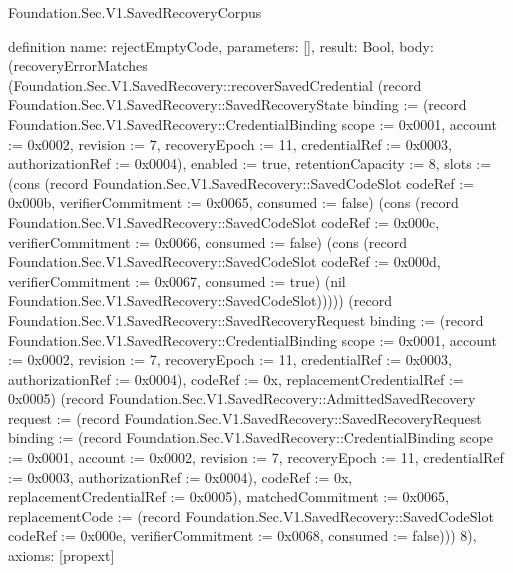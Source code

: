 \begin{lexlean}{Foundation.Sec.V1.SavedRecoveryCorpus}
\begin{semanticmodule}
definition{
  name: rejectEmptyCode,
  parameters: [],
  result: Bool,
  body: (recoveryErrorMatches (Foundation.Sec.V1.SavedRecovery::recoverSavedCredential (record Foundation.Sec.V1.SavedRecovery::SavedRecoveryState {binding := (record Foundation.Sec.V1.SavedRecovery::CredentialBinding {scope := 0x0001, account := 0x0002, revision := 7, recoveryEpoch := 11, credentialRef := 0x0003, authorizationRef := 0x0004}), enabled := true, retentionCapacity := 8, slots := (cons (record Foundation.Sec.V1.SavedRecovery::SavedCodeSlot {codeRef := 0x000b, verifierCommitment := 0x0065, consumed := false}) (cons (record Foundation.Sec.V1.SavedRecovery::SavedCodeSlot {codeRef := 0x000c, verifierCommitment := 0x0066, consumed := false}) (cons (record Foundation.Sec.V1.SavedRecovery::SavedCodeSlot {codeRef := 0x000d, verifierCommitment := 0x0067, consumed := true}) (nil Foundation.Sec.V1.SavedRecovery::SavedCodeSlot))))}) (record Foundation.Sec.V1.SavedRecovery::SavedRecoveryRequest {binding := (record Foundation.Sec.V1.SavedRecovery::CredentialBinding {scope := 0x0001, account := 0x0002, revision := 7, recoveryEpoch := 11, credentialRef := 0x0003, authorizationRef := 0x0004}), codeRef := 0x, replacementCredentialRef := 0x0005}) (record Foundation.Sec.V1.SavedRecovery::AdmittedSavedRecovery {request := (record Foundation.Sec.V1.SavedRecovery::SavedRecoveryRequest {binding := (record Foundation.Sec.V1.SavedRecovery::CredentialBinding {scope := 0x0001, account := 0x0002, revision := 7, recoveryEpoch := 11, credentialRef := 0x0003, authorizationRef := 0x0004}), codeRef := 0x, replacementCredentialRef := 0x0005}), matchedCommitment := 0x0065, replacementCode := (record Foundation.Sec.V1.SavedRecovery::SavedCodeSlot {codeRef := 0x000e, verifierCommitment := 0x0068, consumed := false})})) 8),
  axioms: [propext]
}


\end{semanticmodule}
\end{lexlean}
